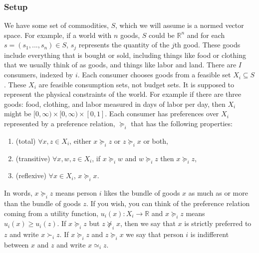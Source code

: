 \documentclass[12pt,reqno]{amsart}
\theoremstyle{definition}
\def\R{\mathbb{R}}
\newcommand{\prefeq}{\succeq}
\newcommand{\pref}{\succ}
\begin{document}
\subsubsection{Setup}

We have some set of commodities, $S$, which we will assume is a normed
vector space. For example, if a world with $n$ goods, $S$ could be
$\R^n$ and for each $s = (s_1,...,s_n) \in S$, $s_j$ represents the
quantity of the $j$th good. These goods include everything that is
bought or sold, including things like food or clothing that we usually
think of as goods, and things like labor and land. There are $I$
consumers, indexed by $i$. Each consumer chooses goods from a feasible
set $X_i \subseteq S$. These $X_i$ are feasible consumption sets, not
budget sets. It is supposed to represent the physical constraints of
the world. For example if there are three goods: food, clothing, and labor
measured in days of labor per day, then $X_i$ might be $[0, \infty)
\times [0,\infty) \times [0, 1]$.  Each consumer has preferences over
$X_i$ represented by a preference relation, $\prefeq_i$ that has the
following properties:
\begin{enumerate}
\item (total) $\forall x, z \in X_i$, either $x \prefeq_i z$ or $z
  \prefeq_i x$ or both,
\item (transitive) $\forall x, w, z \in X_i$, if $x \prefeq_i w$ and $w
  \prefeq_i z$ then $x \prefeq_i z$,
\item (reflexive) $\forall x \in X_i$, $x \prefeq_i x$.
\end{enumerate}
In words, $x \prefeq_i z$ means person $i$ likes the bundle of goods $x$
as much as or more than the bundle of goods $z$. If you wish, you can
think of the preference relation coming from a utility function,
$u_i(x) : X_i \rightarrow \R$ and $x \prefeq_i z$ means $u_i(x) \geq
u_i(z)$.  If $x \prefeq_i z$ but $z \not\prefeq_i x$, then we say that
$x$ is strictly preferred to $z$ and write $x \pref_i z$. If $x
\prefeq_i z$ and $z \prefeq_i x$ we say that person $i$ is indifferent
between $x$ and $z$ and write $x \simeq_i z$.
\end{document}
